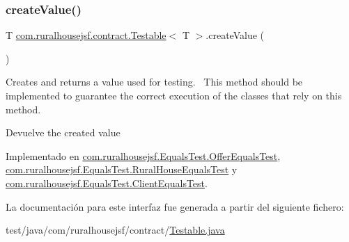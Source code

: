 \subsubsection{\texorpdfstring{createValue()}{createValue()}}
{\footnotesize\ttfamily T \mbox{\hyperlink{interfacecom_1_1ruralhousejsf_1_1contract_1_1_testable}{com.\+ruralhousejsf.\+contract.\+Testable}}$<$ T $>$.create\+Value (\begin{DoxyParamCaption}{ }\end{DoxyParamCaption})}

Creates and returns a value used for testing.~\newline
 This method should be implemented to guarantee the correct execution of the classes that rely on this method.

\begin{DoxyReturn}{Devuelve}
the created value 
\end{DoxyReturn}


Implementado en \mbox{\hyperlink{classcom_1_1ruralhousejsf_1_1_equals_test_1_1_offer_equals_test_a25524d0ab8278899774751c0f7630e8d}{com.\+ruralhousejsf.\+Equals\+Test.\+Offer\+Equals\+Test}}, \mbox{\hyperlink{classcom_1_1ruralhousejsf_1_1_equals_test_1_1_rural_house_equals_test_abcab55b3e63c8d5511f04e395ff0f111}{com.\+ruralhousejsf.\+Equals\+Test.\+Rural\+House\+Equals\+Test}} y \mbox{\hyperlink{classcom_1_1ruralhousejsf_1_1_equals_test_1_1_client_equals_test_aa74f54ea042862db1a5499d31ec75539}{com.\+ruralhousejsf.\+Equals\+Test.\+Client\+Equals\+Test}}.



La documentación para este interfaz fue generada a partir del siguiente fichero\+:\begin{DoxyCompactItemize}
\item 
test/java/com/ruralhousejsf/contract/\mbox{\hyperlink{_testable_8java}{Testable.\+java}}\end{DoxyCompactItemize}
